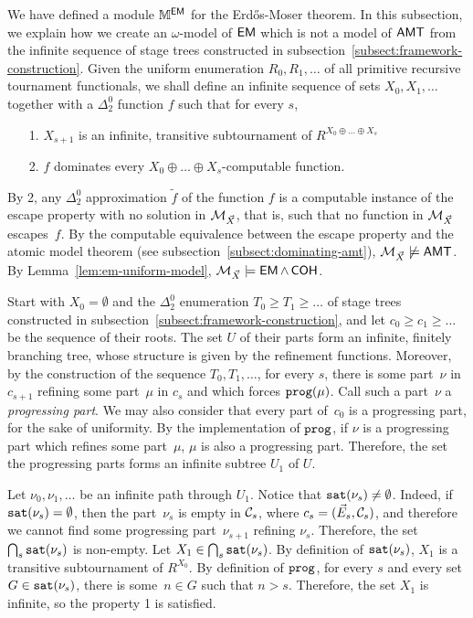We have defined a module $\mathbb{M}^{\operatorname{\sf{EM}}}$ for the Erd\H{o}s-Moser theorem.
In this subsection, we explain how we create an $\omega$-model of $\operatorname{\sf{EM}}$ which is not a model of $\operatorname{\sf{AMT}}$
from the infinite sequence of stage trees constructed in subsection~\ref{subsect:framework-construction}.
Given the uniform enumeration $R_0, R_1, \dots$ of all primitive recursive tournament functionals,
we shall define an infinite sequence of sets $X_0, X_1, \dots$ together with a $\Delta^0_2$ function $f$ such that
for every $s$,
\begin{itemize}
	\item[1.] $X_{s+1}$ is an infinite, transitive subtournament of $R^{X_0 \oplus \dots \oplus X_s}$
	\item[2.] $f$ dominates every $X_0 \oplus \dots \oplus X_s$-computable function.
\end{itemize}
By 2, any $\Delta^0_2$ approximation $\tilde{f}$ of the function $f$ 
is a computable instance of the escape property with no solution in $\mathcal{M}_{\vec{X}}$,
that is, such that no function in $\mathcal{M}_{\vec{X}}$ escapes~$f$.
By the computable equivalence between the escape property and the atomic model theorem (see subsection~\ref{subsect:dominating-amt}), 
$\mathcal{M}_{\vec{X}} \not \models \operatorname{\sf{AMT}}$.
By Lemma~\ref{lem:em-uniform-model}, $\mathcal{M}_{\vec{X}} \models \operatorname{\sf{EM}} \wedge \operatorname{\sf{COH}}$.

Start with $X_0 = \emptyset$ and the $\Delta^0_2$ enumeration $T_0 \geq T_1 \geq \dots$
of stage trees constructed in subsection~\ref{subsect:framework-construction},
and let $c_0 \geq c_1 \geq \dots$ be the sequence of their roots.
The set $U$ of their parts form an infinite, finitely branching tree,
whose structure is given by the refinement functions.
Moreover, by the construction of the sequence $T_0, T_1, \dots$, for every $s$, 
there is some part~$\nu$ in $c_{s+1}$ refining some part~$\mu$
in $c_s$ and which forces $\mathtt{prog}(\mu)$. Call such a part~$\nu$ a \emph{progressing part}. We may also
consider that every part of~$c_0$ is a progressing part, for the sake of uniformity.
By the implementation of $\mathtt{prog}$, if $\nu$ is a progressing part which refines some part~$\mu$,
$\mu$ is also a progressing part. Therefore, the set the progressing parts forms an infinite subtree $U_1$ of $U$.

Let $\nu_0, \nu_1, \dots$ be an infinite path through $U_1$.
Notice that $\mathtt{sat}(\nu_s) \neq \emptyset$.
Indeed, if $\mathtt{sat}(\nu_s) = \emptyset$, then the part~$\nu_s$ is empty in $\mathcal{C}_s$, where $c_s = (\vec{E}_s, \mathcal{C}_s)$,
and therefore we cannot find some progressing part~$\nu_{s+1}$ refining $\nu_s$.
Therefore, the set $\bigcap_s \mathtt{sat}(\nu_s)$ is non-empty. Let $X_1 \in \bigcap_s \mathtt{sat}(\nu_s)$.
By definition of $\mathtt{sat}(\nu_s)$, $X_1$ is a transitive subtournament of $R^{X_0}$.
By definition of $\mathtt{prog}$, for every $s$ and every set $G \in \mathtt{sat}(\nu_s)$, there is some~$n \in G$ such that $n > s$.
Therefore, the set $X_1$ is infinite, so the property 1 is satisfied.

